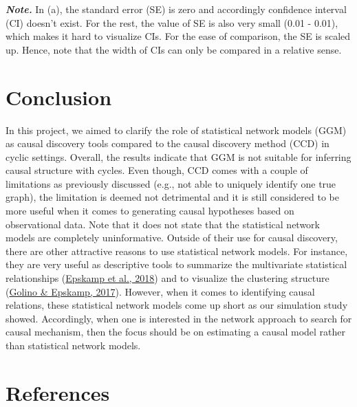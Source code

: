 \documentclass[
]{article}
\begin{document}
\vspace{-0.3cm}

\noindent\small\textit{\textbf{Note.}} In (a), the standard error (SE) is zero and accordingly confidence interval (CI) doesn't exist. For the rest, the value of SE is also very small (0.01 - 0.01), which makes it hard to visualize CIs. For the ease of comparison, the SE is scaled up. Hence, note that the width of CIs can only be compared in a relative sense.

\normalsize
{}

\newpage

\hypertarget{conclusion}{%
\section{Conclusion}\label{conclusion}}

\noindent In this project, we aimed to clarify the role of statistical network models (GGM) as causal discovery tools compared to the causal discovery method (CCD) in cyclic settings. Overall, the results indicate that GGM is not suitable for inferring causal structure with cycles. Even though, CCD comes with a couple of limitations as previously discussed (e.g., not able to uniquely identify one true graph), the limitation is deemed not detrimental and it is still considered to be more useful when it comes to generating causal hypotheses based on observational data. Note that it does not state that the statistical network models are completely uninformative. Outside of their use for causal discovery, there are other attractive reasons to use statistical network models. For instance, they are very useful as descriptive tools to summarize the multivariate statistical relationships (\protect\hyperlink{ref-epskamp_gaussian_2018}{Epskamp et al., 2018}) and to visualize the clustering structure (\protect\hyperlink{ref-golino_exploratory_2017}{Golino \& Epskamp, 2017}). However, when it comes to identifying causal relations, these statistical network models come up short as our simulation study showed. Accordingly, when one is interested in the network approach to search for causal mechanism, then the focus should be on estimating a causal model rather than statistical network models.

\hypertarget{references}{%
\section{References}\label{references}}
\end{document}
